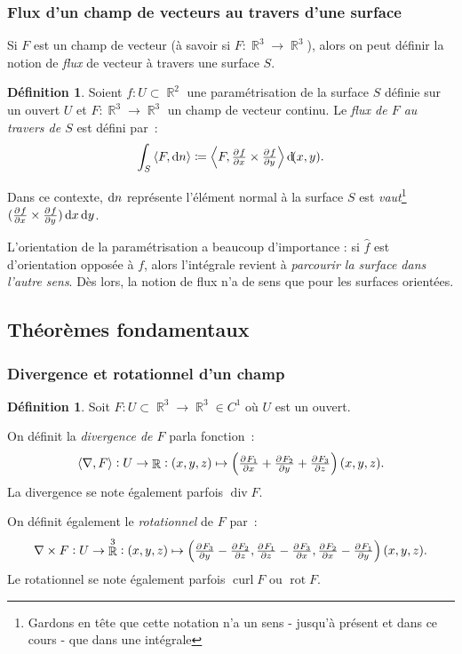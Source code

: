 \documentclass{article}
\DeclareMathOperator{\R}{\mathbb R}
\DeclareMathOperator{\divop}{div}
\DeclareMathOperator{\rotop}{rot}
\DeclareMathOperator{\curl}{curl}
\newcommand{\scpr}[2]{{\left\langle#1, #2\right\rangle}}
\newcommand{\divg}[1]{\scpr \nabla {#1}}
\newcommand{\rot}[1]{\nabla \times #1}
\theoremstyle{definition}
\newtheorem{déf}[thm]{Définition}
\theoremstyle{remark}
\begin{document}
		\subsubsection{Flux d'un champ de vecteurs au travers d'une surface}
		Si $F$ est un champ de vecteur (à savoir si $F : \R^3 \to \R^3$), alors on peut définir la notion de \emph{flux} de vecteur à travers une surface $S$.

		\begin{déf} Soient $f : U \subset \R^2$ une paramétrisation de la surface $S$ définie sur un ouvert $U$ et $F : \R^3 \to \R^3$ un champ de vecteur
		continu. Le \emph{flux de $F$ au travers de $S$} est défini par~:
		\[\int_S\scpr F{\dif n} \coloneqq \scpr F{\pd fx \times \pd fy}\dif (x, y).\]
		\end{déf}

		Dans ce contexte, $\dif n$ représente l'élément normal à la surface $S$ est \emph{vaut}\footnote{Gardons en tête que cette notation n'a un sens \--
		jusqu'à présent et dans ce cours \-- que dans une intégrale} $(\pd fx \times \pd fy)\dif x\dif y$.

		L'orientation de la paramétrisation a beaucoup d'importance : si $\hat f$ est d'orientation opposée à $f$, alors l'intégrale revient à
		\emph{parcourir la surface dans l'autre sens}. Dès lors, la notion de flux n'a de sens que pour les surfaces orientées.

	\subsection{Théorèmes fondamentaux}
		\subsubsection{Divergence et rotationnel d'un champ}
		\begin{déf} Soit $F : U \subset \R^3 \to \R^3 \in C^1$ où $U$ est un ouvert.

		On définit la \emph{divergence de $F$} parla fonction~:
		\[\divg F : U \to \R : (x, y, z) \mapsto \left(\pd {F_1}x + \pd {F_2}y + \pd {F_3}z\right)(x, y, z).\]
		La divergence se note également parfois $\divop F$.

		On définit également le \emph{rotationnel} de $F$ par~:
		\[\rot F : U \to \R^3 : (x, y, z) \mapsto \left(\pd {F_3}y - \pd {F_2}z, \pd {F_1}z - \pd {F_3}x, \pd {F_2}x - \pd {F_1}y\right)(x, y, z).\]
		Le rotationnel se note également parfois $\curl F$ ou $\rotop F$.
		\end{déf}
\end{document}
